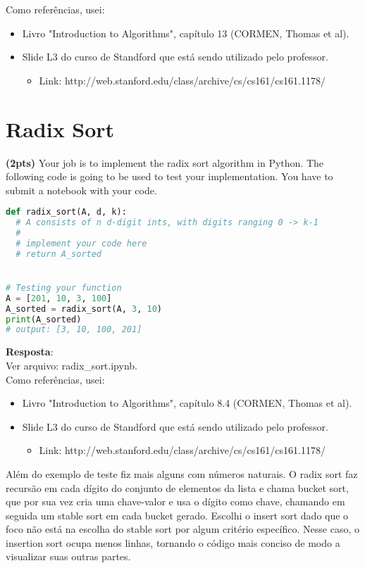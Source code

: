 \documentclass{article}
\begin{document}
Como referências, usei:
\begin{itemize}
	\item Livro "Introduction to Algorithms", capítulo 13 (CORMEN, Thomas et al).
	\item Slide L3 do curso de Standford que está sendo utilizado pelo professor. 
	\begin{itemize}
		\item Link: http://web.stanford.edu/class/archive/cs/cs161/cs161.1178/
	\end{itemize}
\end{itemize}

\section{Radix Sort}

\textbf{(2pts) }Your job is to implement the radix sort algorithm in Python. The following code is going to be used to test your implementation. You have to submit a notebook with your code. 
  
\begin{lstlisting}[language=Python]
def radix_sort(A, d, k):
  # A consists of n d-digit ints, with digits ranging 0 -> k-1
  #
  # implement your code here
  # return A_sorted


# Testing your function
A = [201, 10, 3, 100]
A_sorted = radix_sort(A, 3, 10)
print(A_sorted)
# output: [3, 10, 100, 201]
\end{lstlisting}

\textbf{Resposta}:\\

Ver arquivo: radix\_sort.ipynb.\\

Como referências, usei:
\begin{itemize}
	\item Livro "Introduction to Algorithms", capítulo 8.4 (CORMEN, Thomas et al).
	\item Slide L3 do curso de Standford que está sendo utilizado pelo professor. 
	\begin{itemize}
		\item Link: http://web.stanford.edu/class/archive/cs/cs161/cs161.1178/
	\end{itemize}
\end{itemize}
  
 
Além do exemplo de teste fiz mais alguns com números naturais. O radix sort faz  recursão em cada dígito do conjunto de elementos da lista e chama bucket sort, que por sua vez cria uma chave-valor e usa o dígito como chave, chamando em seguida um stable sort em cada bucket gerado. Escolhi o insert sort dado que o foco não está na escolha do stable sort por algum critério específico. Nesse caso, o insertion sort ocupa menos linhas, tornando o código mais conciso de modo a visualizar suas outras partes.
\end{document}
